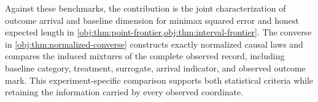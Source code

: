 Against these benchmarks, the contribution is the joint characterization of outcome arrival and baseline dimension for minimax squared error and honest expected length in \cref{obj:thm:point-frontier,obj:thm:interval-frontier}. The converse in \cref{obj:thm:normalized-converse} constructs exactly normalized causal laws and compares the induced mixtures of the complete observed record, including baseline category, treatment, surrogate, arrival indicator, and observed outcome mark. This experiment-specific comparison supports both statistical criteria while retaining the information carried by every observed coordinate.
